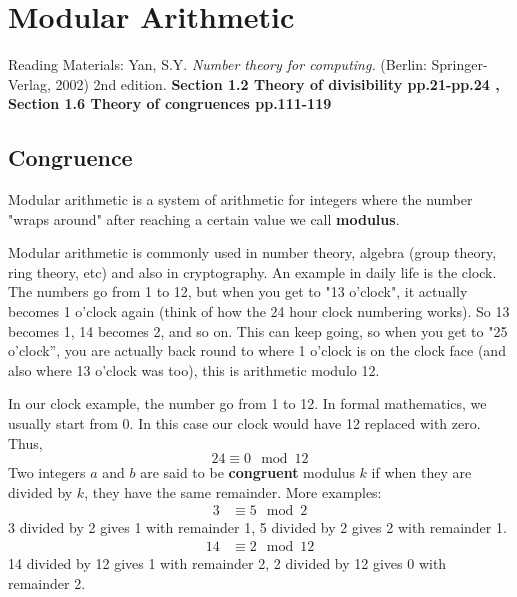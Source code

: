 \chapter{Modular Arithmetic}
Reading Materials: \newline
Yan, S.Y. \textit{Number theory for computing.} (Berlin: Springer-Verlag, 2002) 2nd edition. \textbf{Section 1.2 Theory of divisibility pp.21-pp.24 , Section 1.6 Theory of congruences pp.111-119}
\section{Congruence}
\noindent Modular arithmetic is a system of arithmetic for integers where the number "wraps around" after reaching a certain value we call \textbf{modulus}.

\vspace{5mm}

\noindent Modular arithmetic is commonly used in number theory, algebra (group theory, ring theory, etc) and also in cryptography. An example in daily life is the clock. The numbers go from 1 to 12, but when you get to "13 o'clock", it actually becomes 1 o'clock again (think of how the 24 hour clock numbering works). So 13 becomes 1, 14 becomes 2, and so on. This can keep going, so when you get to "25 o'clock'', you are actually back round to where 1 o'clock is on the clock face (and also where 13 o'clock was too), this is arithmetic modulo 12.

\vspace{5mm}

\noindent In our clock example, the number go from 1 to 12. In formal mathematics, we usually start from 0. In this case our clock would have 12 replaced with zero. Thus,
\begin{equation}
24\equiv 0 \mod{12}
\end{equation}
\noindent Two integers $a$ and $b$ are said to be \textbf{congruent} modulus $k$ if when they are divided by $k$, they have the same remainder.
\vspace{5mm}
\noindent More examples:
\begin{equation}
\begin{split}
3 &\equiv 5 \mod{2} 
\end{split}
\end{equation}
3 divided by 2 gives 1 with remainder 1, 5 divided by 2 gives 2 with remainder 1.
\begin{equation}
\begin{split}
14 &\equiv 2 \mod{12} 
\end{split}
\end{equation}
14 divided by 12 gives 1 with remainder 2, 2 divided by 12 gives 0 with remainder 2.
\vspace{5mm}

